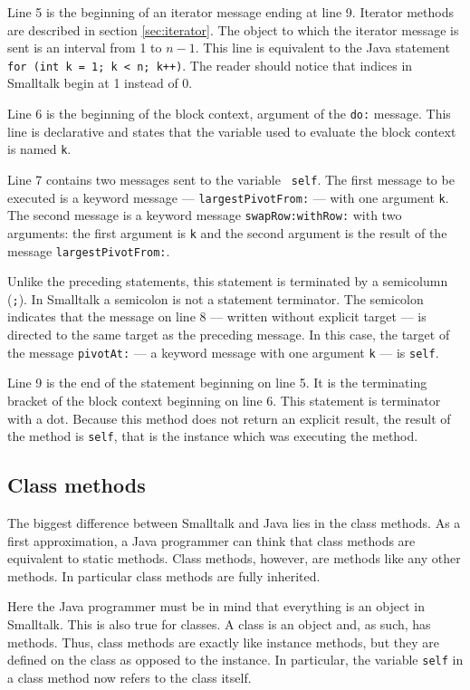 \documentclass[twoside]{book}
\begin{document}
\noindent Line 5 is the beginning of an iterator message ending at
line 9. Iterator methods are described in section
\ref{sec:iterator}. The object to which the iterator message is
sent is an interval from 1 to $n-1$. This line is equivalent to
the Java statement {\tt for (int k = 1; k < n; k++)}. The reader
should notice that indices in Smalltalk begin at 1 instead of 0.

\noindent Line 6 is the beginning of the block context, argument
of the {\tt do:} message. This line is declarative and states that
the variable used to evaluate the block context is named {\tt k}.

\noindent Line 7 contains two messages sent to the variable {\tt
self}. The first message to be executed is a keyword message
--- {\tt largestPivotFrom:} --- with one argument {\tt k}. The
second message is a keyword message {\tt swapRow:withRow:} with
two arguments: the first argument is {\tt k} and the second
argument is the result of the message {\tt largestPivotFrom:}.

\noindent Unlike the preceding statements, this statement is
terminated by a semicolumn ({\tt ;}). In Smalltalk a semicolon is
not a statement terminator. The semicolon indicates that the
message on line 8 --- written without explicit target --- is
directed to the same target as the preceding message. In this
case, the target of the message {\tt pivotAt:} --- a keyword
message with one argument {\tt k} --- is {\tt self}.

\noindent Line 9 is the end of the statement beginning on line 5.
It is the terminating bracket of the block context beginning on
line 6. This statement is terminator with a dot. Because this
method does not return an explicit result, the result of the
method is {\tt self}, that is the instance which was executing the
method.

\subsection{Class methods}
The biggest difference between Smalltalk and Java lies in the
class methods. As a first approximation, a Java programmer can
think that class methods are equivalent to static methods. Class
methods, however, are methods like any other methods. In
particular class methods are fully inherited.

Here the Java programmer must be in mind that everything is an
object in Smalltalk. This is also true for classes. A class is an
object and, as such, has methods. Thus, class methods are exactly
like instance methods, but they are defined on the class as
opposed to the instance. In particular, the variable {\tt self} in
a class method now refers to the class itself.
\end{document}
